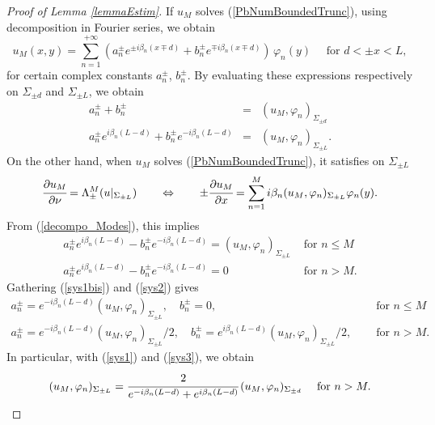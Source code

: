 \documentclass[11pt,a4paper]{report}
\begin{document}
\begin{proof}[Proof of Lemma \ref{lemmaEstim}]
If $u_M$ solves (\ref{PbNumBoundedTrunc}), using decomposition in Fourier series, we obtain 
\begin{equation}\label{decompo_Modes}
u_M(x,y)=\sum_{n=1}^{+\infty}(a^\pm_n e^{\pm i\beta_n(x\mp d)}+b_n^\pm e^{\mp i\beta_n(x\mp d)})\,\varphi_n(y)\quad\mbox{ for }d<\pm x <L,
\end{equation}
for certain complex constants $a^\pm_n$, $b^\pm_n$. By evaluating these expressions respectively on $\Sigma_{\pm d}$ and $\Sigma_{\pm L}$, we obtain
\begin{eqnarray}
a^\pm_n+b^\pm_n&=&(u_M,\varphi_n)_{\Sigma_{\pm d}} \label{sys1}\\
 a^\pm_ne^{i\beta_n(L-d)}+b^\pm_ne^{- i\beta_n(L-d)}&=&(u_M,\varphi_n)_{\Sigma_{\pm L}}.\label{sys1bis}
\end{eqnarray}
On the other hand, when $u_M$ solves (\ref{PbNumBoundedTrunc}), it satisfies on $\Sigma_{\pm L}$
\[
\cfrac{\partial u_M}{\partial \nu} = \Lambda^M_\pm(u|_{\Sigma_{\pm L}})\qquad\Leftrightarrow\qquad\pm\cfrac{\partial u_M}{\partial x}=\sum_{n=1}^M i\beta_n (u_M,\varphi_n)_{\Sigma_{\pm L}}\varphi_n(y).
\]
From (\ref{decompo_Modes}), this implies
\begin{equation}\label{sys2}
\begin{array}{|ll}
a^\pm_ne^{i\beta_n(L-d)}-b^\pm_ne^{-i\beta_n(L-d)}=(u_M,\varphi_n)_{\Sigma_{\pm L}}&\mbox{ for }n\le M\\[3pt]
a^\pm_ne^{i\beta_n(L-d)}-b^\pm_ne^{-i\beta_n(L-d)}=0&\mbox{ for }n > M.
\end{array}
\end{equation}
Gathering (\ref{sys1bis}) and (\ref{sys2}) gives
\begin{equation}\label{sys3}
\begin{array}{|ll}
a^\pm_n=e^{-i\beta_n (L-d)}(u_M,\varphi_n)_{\Sigma_{\pm L}},\quad b^\pm_n=0, &\quad\mbox{ for }n\le M\\[3pt]
a^\pm_n=e^{-i\beta_n (L-d)}(u_M,\varphi_n)_{\Sigma_{\pm L}}/2,\quad b^\pm_n=e^{i\beta_n (L-d)}(u_M,\varphi_n)_{\Sigma_{\pm L}}/2, &\quad\mbox{ for }n > M.
\end{array}
\end{equation}
In particular, with (\ref{sys1}) and (\ref{sys3}), we obtain
\begin{equation}\label{sys4}
(u_M,\varphi_n)_{\Sigma_{\pm L}}=\cfrac{2}{e^{-i\beta_n(L-d)}+e^{i\beta_n(L-d)}}\,(u_M,\varphi_n)_{\Sigma_{\pm d}}\quad\mbox{ for }n > M.
\end{equation}

\end{proof}
\end{document}
